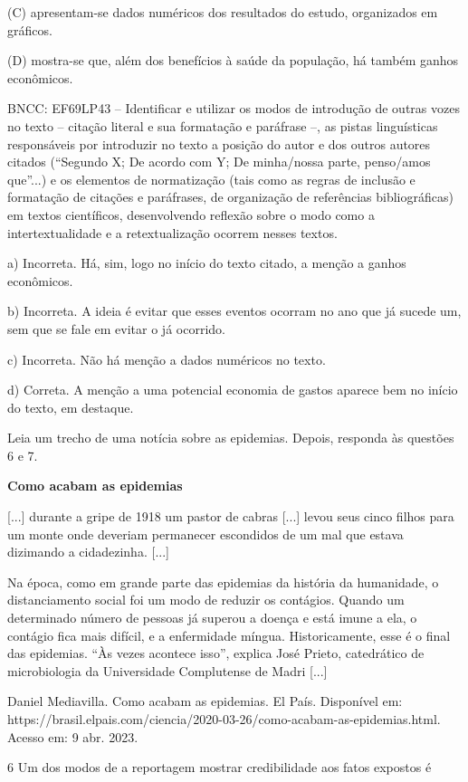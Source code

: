 \begin{itemize}
\begin{itemize}
{\begin{itemize}
\begin{itemize}
\begin{escolha}
\begin{escolha}
\begin{escolha}
\begin{escolha}
\begin{escolha}
(C) apresentam-se dados numéricos dos resultados do estudo, organizados
em gráficos.

(D) mostra-se que, além dos benefícios à saúde da população, há também
ganhos econômicos.

BNCC: EF69LP43 -- Identificar e utilizar os modos de introdução de
outras vozes no texto -- citação literal e sua formatação e paráfrase
--, as pistas linguísticas responsáveis por introduzir no texto a
posição do autor e dos outros autores citados (``Segundo X; De acordo
com Y; De minha/nossa parte, penso/amos que''...) e os elementos de
normatização (tais como as regras de inclusão e formatação de citações e
paráfrases, de organização de referências bibliográficas) em textos
científicos, desenvolvendo reflexão sobre o modo como a
intertextualidade e a retextualização ocorrem nesses textos.

a) Incorreta. Há, sim, logo no início do texto citado, a menção a ganhos
econômicos.

b) Incorreta. A ideia é evitar que esses eventos ocorram no ano que já
sucede um, sem que se fale em evitar o já ocorrido.

c) Incorreta. Não há menção a dados numéricos no texto.

d) Correta. A menção a uma potencial economia de gastos aparece bem no
início do texto, em destaque.

Leia um trecho de uma notícia sobre as epidemias. Depois, responda às
questões 6 e 7.

\textbf{Como acabam as epidemias}

{[}...{]} durante a gripe de 1918 um pastor de cabras {[}...{]} levou
seus cinco filhos para um monte onde deveriam permanecer escondidos de
um mal que estava dizimando a cidadezinha. {[}...{]}

Na época, como em grande parte das epidemias da história da humanidade,
o distanciamento social foi um modo de reduzir os contágios. Quando um
determinado número de pessoas já superou a doença e está imune a ela, o
contágio fica mais difícil, e a enfermidade míngua. Historicamente, esse
é o final das epidemias. ``Às vezes acontece isso'', explica José
Prieto, catedrático de microbiologia da Universidade Complutense de
Madri {[}...{]}

Daniel Mediavilla. Como acabam as epidemias. El País. Disponível em:
https://brasil.elpais.com/ciencia/2020-03-26/como-acabam-as-epidemias.html.
Acesso em: 9 abr. 2023.

\num{6} Um dos modos de a reportagem mostrar credibilidade aos fatos
expostos é


\end{escolha}
\end{escolha}
\end{escolha}
\end{escolha}
\end{escolha}
\end{itemize}
\end{itemize}}
\end{itemize}
\end{itemize}
